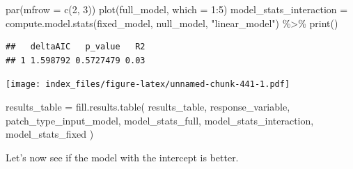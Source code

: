 \documentclass[
]{article}
\newenvironment{Shaded}{\begin{snugshade}}{\end{snugshade}}
\newcommand{\AttributeTok}[1]{\textcolor[rgb]{0.77,0.63,0.00}{#1}}
\newcommand{\DecValTok}[1]{\textcolor[rgb]{0.00,0.00,0.81}{#1}}
\newcommand{\FunctionTok}[1]{\textcolor[rgb]{0.00,0.00,0.00}{#1}}
\newcommand{\NormalTok}[1]{#1}
\newcommand{\OtherTok}[1]{\textcolor[rgb]{0.56,0.35,0.01}{#1}}
\newcommand{\SpecialCharTok}[1]{\textcolor[rgb]{0.00,0.00,0.00}{#1}}
\newcommand{\StringTok}[1]{\textcolor[rgb]{0.31,0.60,0.02}{#1}}
\begin{document}
\begin{Shaded}
\begin{Highlighting}[]
\FunctionTok{par}\NormalTok{(}\AttributeTok{mfrow =} \FunctionTok{c}\NormalTok{(}\DecValTok{2}\NormalTok{, }\DecValTok{3}\NormalTok{))}
\FunctionTok{plot}\NormalTok{(full\_model, }\AttributeTok{which =} \DecValTok{1}\SpecialCharTok{:}\DecValTok{5}\NormalTok{)}
\NormalTok{model\_stats\_interaction }\OtherTok{=} \FunctionTok{compute.model.stats}\NormalTok{(fixed\_model,}
\NormalTok{                                              null\_model,}
                                              \StringTok{"linear\_model"}\NormalTok{) }\SpecialCharTok{\%\textgreater{}\%}
  \FunctionTok{print}\NormalTok{()}
\end{Highlighting}
\end{Shaded}

\begin{verbatim}
##   deltaAIC   p_value   R2
## 1 1.598792 0.5727479 0.03
\end{verbatim}

\texttt{[image: index\_files/figure-latex/unnamed-chunk-441-1.pdf]}

\begin{Shaded}
\begin{Highlighting}[]
\NormalTok{results\_table }\OtherTok{=} \FunctionTok{fill.results.table}\NormalTok{(}
\NormalTok{  results\_table,}
\NormalTok{  response\_variable,}
\NormalTok{  patch\_type\_input\_model,}
\NormalTok{  model\_stats\_full,}
\NormalTok{  model\_stats\_interaction,}
\NormalTok{  model\_stats\_fixed}
\NormalTok{)}
\end{Highlighting}
\end{Shaded}

Let's now see if the model with the intercept is better.
\end{document}
